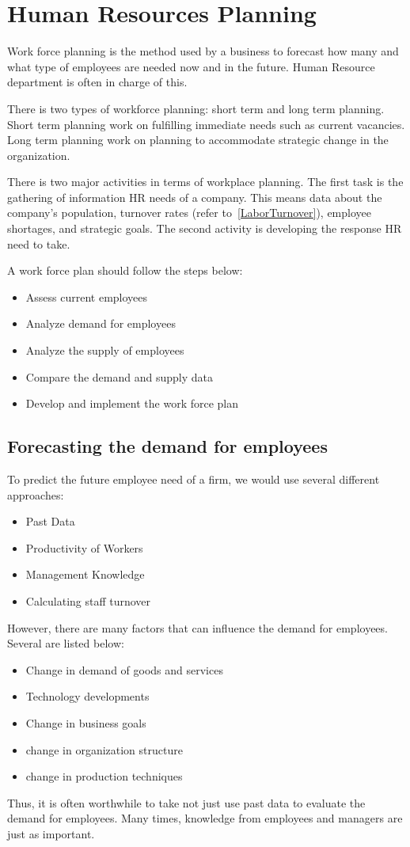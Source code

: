 \documentclass{standalone}
\begin{document}
\section{Human Resources Planning}
Work force planning is the method used by a business to forecast how many and what type of employees are needed now and in the future.
Human Resource department is often in charge of this. 

There is two types of workforce planning: short term and long term planning.
Short term planning work on fulfilling immediate needs such as current vacancies.
Long term planning work on planning to accommodate strategic change in the organization.

There is two major activities in terms of workplace planning.
The first task is the gathering of information HR needs of a company. 
This means data about the company's population, turnover rates (refer to~\ref{LaborTurnover}), employee shortages, and strategic goals.  The second activity is developing the response HR need to take.

A work force plan should follow the steps below:
\begin{itemize}
	\item Assess current employees
	\item Analyze demand for employees
	\item Analyze the supply of employees
	\item Compare the demand and supply data
	\item Develop and implement the work force plan
\end{itemize}

\subsection{Forecasting the demand for employees}
To predict the future employee need of a firm, we would use several different approaches:
\begin{itemize}
	\item Past Data
	\item Productivity of Workers
	\item Management Knowledge
	\item Calculating staff turnover
\end{itemize}

However, there are many factors that can influence the demand for employees.
Several are listed below:
\begin{itemize}
	\item Change in demand of goods and services
	\item Technology developments
	\item Change in business goals
	\item change in organization structure
	\item change in production techniques
\end{itemize}
Thus, it is often worthwhile to take not just use past data to evaluate the demand for employees.
Many times, knowledge from employees and managers are just as important.
\end{document}
